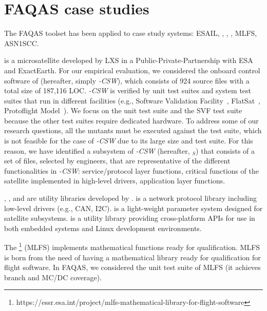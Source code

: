 
\chapter{FAQAS case studies}
\label{chapter:caseStudies}
 

\STARTCHANGEDFINAL
The FAQAS toolset has been applied to  case study systems:
ESAIL, \GCSP{}, \PARAM{}, \UTIL{}, MLFS, ASN1SCC.

 
 is a microsatellite developed by LXS in a Public-Private-Partnership with ESA and ExactEarth. For our empirical evaluation, we considered the onboard control software of \SAIL{} (hereafter, simply \SAIL{}\emph{-CSW}), which consists of 924 source files with a total size of 187,116 LOC. 
\SAIL{}\emph{-CSW} is verified by unit test suites and system test suites that run in different facilities (e.g., Software Validation Facility~\cite{Isasi2019}, FlatSat~\cite{Eickhoff:Simulate}, Protoflight Model~\cite{ecssHB10A}). We focus on the unit test suite and the SVF test suite because the other test suites require dedicated hardware.  
To address some of our research questions, all the mutants must be executed against the test suite, which is not feasible for the case of \SAIL{}\emph{-CSW} due to its large size and test suite. For this reason, we have identified a subsystem of \SAIL{}\emph{-CSW} (hereafter, \emph{\SAIL{}}$_{S}$) that consists of a set of files, selected by \TWO engineers, that are representative of the different functionalities in \SAIL{}\emph{-CSW}: service/protocol layer functions, critical functions of the satellite implemented in high-level drivers, application layer functions.

\INDEX{\GCSP{}}, \INDEX{\PARAM{}}, and \INDEX{\UTIL{}}  are utility libraries developed by \ONE.
\emph{\GCSP{}} is a network protocol library including low-level drivers (e.g., CAN, I2C).
{\PARAM{}} is a light-weight parameter system designed for \ONE satellite subsystems. 
{\UTIL{}} is a utility library providing cross-platform APIs for use in both embedded systems and Linux development environments.



The \footnote{https://essr.esa.int/project/mlfs-mathematical-library-for-flight-software} (MLFS) implements mathematical functions ready for qualification. 
MLFS is born from the need of having a mathematical library ready for qualification for flight software. 
In FAQAS, we considered the unit test suite of MLFS (it achieves branch and MC/DC coverage).

